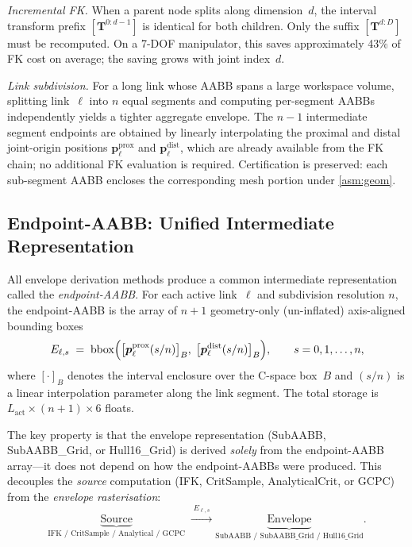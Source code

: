 \documentclass[journal]{IEEEtran}
\newcommand{\bT}{\mathbf{T}}
\begin{document}
\emph{Incremental FK.}
When a parent node splits along dimension~$d$, the interval transform
prefix $[\bT^{0:d-1}]$ is identical for both children.
Only the suffix $[\bT^{d:D}]$ must be recomputed.
On a 7-DOF manipulator, this saves approximately 43\% of FK cost on
average; the saving grows with joint index~$d$.

\emph{Link subdivision.}
For a long link whose AABB spans a large workspace volume,
splitting link~$\ell$ into $n$ equal segments and computing per-segment
AABBs independently yields a tighter aggregate envelope.
The $n{-}1$ intermediate segment endpoints are obtained by linearly
interpolating the proximal and distal joint-origin positions
$\bm{p}_\ell^{\mathrm{prox}}$ and $\bm{p}_\ell^{\mathrm{dist}}$,
which are already available from the FK chain; no additional FK
evaluation is required.
Certification is preserved: each sub-segment AABB encloses the
corresponding mesh portion under \cref{asm:geom}.

\subsection{Endpoint-AABB: Unified Intermediate Representation}%
\label{sec:endpoint_aabb}

All envelope derivation methods produce a common intermediate
representation called the \emph{endpoint-AABB}.
For each active link~$\ell$ and subdivision resolution $n$,
the endpoint-AABB is the array of $n{+}1$ geometry-only
(un-inflated) axis-aligned bounding boxes
\begin{equation}\label{eq:ep_aabb}
  E_{\ell,s} \;=\;
  \mathrm{bbox}\Bigl(
    \bigl[\bm{p}_\ell^\mathrm{prox}(s/n)\bigr]_B,\;
    \bigl[\bm{p}_\ell^\mathrm{dist}(s/n)\bigr]_B
  \Bigr),
  \qquad s = 0,1,\ldots,n,
\end{equation}
where $[\cdot]_B$ denotes the interval enclosure over the C-space
box~$B$ and $(s/n)$ is a linear interpolation parameter along the
link segment.
The total storage is $L_\text{act} \times (n{+}1) \times 6$ floats.

The key property is that the envelope representation (SubAABB,
SubAABB\_Grid, or Hull16\_Grid) is derived \emph{solely} from
the endpoint-AABB array---it does not depend on how the
endpoint-AABBs were produced.
This decouples the \emph{source} computation
(IFK, CritSample, AnalyticalCrit, or GCPC) from the
\emph{envelope rasterisation}:
\begin{equation}\label{eq:pipeline}
  \underbrace{\text{Source}}_{\text{IFK / CritSample / Analytical / GCPC}}
  \;\xrightarrow{\;E_{\ell,s}\;}
  \underbrace{\text{Envelope}}_{\text{SubAABB / SubAABB\_Grid / Hull16\_Grid}}.
\end{equation}
\end{document}
